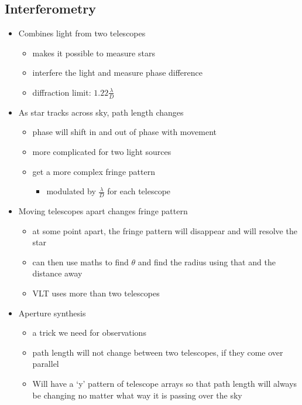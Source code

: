 \documentclass[a4paper,11pt,normalem]{article}
\begin{document}
\subsection{Interferometry}
\begin{itemize}
    \item Combines light from two telescopes
        \begin{itemize}
            \item makes it possible to measure stars
            \item interfere the light and measure phase difference
            \item diffraction limit: \(1.22\frac{\lambda}{D}\)
        \end{itemize}
    \item As star tracks across sky, path length changes
        \begin{itemize}
            \item phase will shift in and out of phase with movement
            \item more complicated for two light sources
            \item get a more complex fringe pattern
                \begin{itemize}
                    \item modulated by \(\frac{\lambda}{D}\) for each telescope
                \end{itemize}
        \end{itemize}
    \item Moving telescopes apart changes fringe pattern
        \begin{itemize}
            \item at some point apart, the fringe pattern will disappear and will resolve the star
            \item can then use maths to find \(\theta\) and find the radius using that and the distance away
            \item VLT uses more than two telescopes
        \end{itemize}
    \item Aperture synthesis
        \begin{itemize}
            \item a trick we need for observations
            \item path length will not change between two telescopes, if they come over parallel
            \item Will have a `y' pattern of telescope arrays so that path length will always be changing no matter what way it is passing over the sky
        \end{itemize}
\end{itemize}
\end{document}
